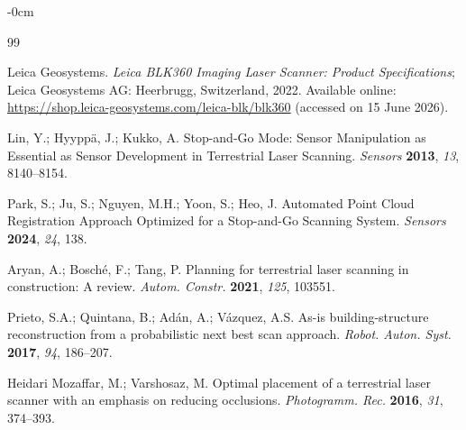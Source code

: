\documentclass[sensors,article,submit,pdftex,moreauthors]{Definitions/mdpi}
\begin{document}
\begin{adjustwidth}{-\extralength}{0cm}



% 


\begin{thebibliography}{99}

Leica Geosystems. \textit{Leica BLK360 Imaging Laser Scanner: Product Specifications}; Leica Geosystems AG: Heerbrugg, Switzerland, 2022. Available online: \url{https://shop.leica-geosystems.com/leica-blk/blk360} (accessed on 15 June 2026).

Lin, Y.; Hyypp\"a, J.; Kukko, A. Stop-and-Go Mode: Sensor Manipulation as Essential as Sensor Development in Terrestrial Laser Scanning. \textit{Sensors} \textbf{2013}, \textit{13}, 8140--8154.

Park, S.; Ju, S.; Nguyen, M.H.; Yoon, S.; Heo, J. Automated Point Cloud Registration Approach Optimized for a Stop-and-Go Scanning System. \textit{Sensors} \textbf{2024}, \textit{24}, 138.

Aryan, A.; Bosch\'e, F.; Tang, P. Planning for terrestrial laser scanning in construction: A review. \textit{Autom. Constr.} \textbf{2021}, \textit{125}, 103551.

Prieto, S.A.; Quintana, B.; Adán, A.; Vázquez, A.S. As-is building-structure reconstruction from a probabilistic next best scan approach. \textit{Robot. Auton. Syst.} \textbf{2017}, \textit{94}, 186--207.

Heidari Mozaffar, M.; Varshosaz, M. Optimal placement of a terrestrial laser scanner with an emphasis on reducing occlusions. \textit{Photogramm. Rec.} \textbf{2016}, \textit{31}, 374--393.


\end{thebibliography}
\end{adjustwidth}
\end{document}
